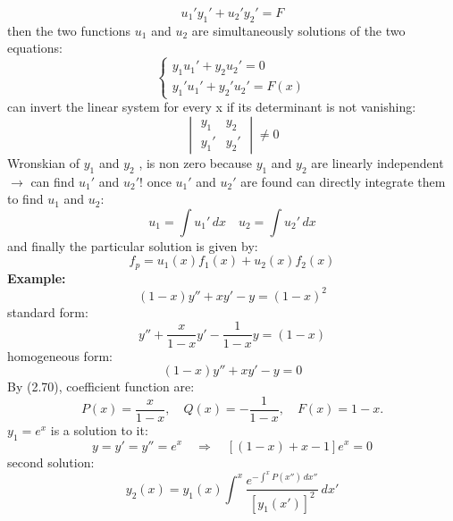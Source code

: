 \documentclass{article}
\begin{document}
\begin{equation}
    u_1' y_1' + u_2' y_2' = F
\end{equation}
then the two functions $u_1$ and $u_2$ are simultaneously solutions of the two equations:
\begin{equation}
    \begin{cases}
        y_1 u_1' + y_2 u_2' = 0 \\ y_1' u_1' + y_2' u_2' = F(x)
    \end{cases}
\end{equation}
can invert the linear system for every x if its determinant is not vanishing:
\begin{equation}
    \begin{vmatrix}
y_1 & y_2 \\
y_1' & y_2'
\end{vmatrix}
\neq 0
\end{equation}
Wronskian of $y_1$ and $y_2$ , is non zero because $y_1$ and $y_2$ are linearly independent $\rightarrow$ can find $u_1'$ and $u_2'$!
\newpage
\noindent
once $u_1'$ and $u_2'$ are found can directly integrate them to find $u_1$ and $u_2$:
\begin{equation}
    u_1 = \int u_1'\, dx \quad u_2 = \int u_2'\, dx
\end{equation}
and finally the particular solution is given by:
\begin{equation}
    f_p = u_1(x) f_1(x) + u_2(x) f_2(x)
\end{equation}
\noindent
\textbf{Example:}
\begin{equation}
    (1 - x) y'' + x y' - y = (1 - x)^2
\end{equation}
standard form:
\begin{equation}
    y'' + \frac{x}{1 - x} y' - \frac{1}{1 - x} y = (1 - x)
\end{equation}
homogeneous form:
\begin{equation}
    (1 - x) y'' + x y' - y = 0
\end{equation}
By (2.70), coefficient function are:
\begin{equation}
    P(x) = \frac{x}{1 - x}, \quad Q(x) = -\frac{1}{1 - x}, \quad F(x) = 1 - x.
\end{equation}
$y_1 = e^x$ is a solution to it:
\begin{equation}
    y = y' = y'' = e^x \quad \Rightarrow \quad \left[(1 - x) + x - 1\right] e^x = 0
\end{equation}
second solution:
\begin{equation}
    y_2(x) = y_1(x) \int^x \frac{e^{-\int^x P(x'')\,dx''}}{\left[y_1(x')\right]^2} \, dx'
\end{equation}
\end{document}
